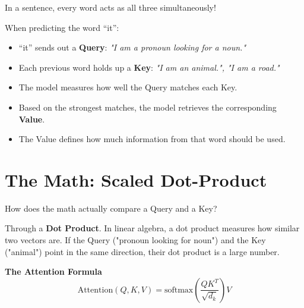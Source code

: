 \documentclass[11pt]{article}
\begin{document}
\vspace{0.15in}

In a sentence, every word acts as all three simultaneously!

When predicting the word ``it'':
\begin{itemize}[leftmargin=*, itemsep=0.1in]
    \item ``it'' sends out a \textbf{Query}: \textit{"I am a pronoun looking for a noun."}
    \item Each previous word holds up a \textbf{Key}: \textit{"I am an animal.", "I am a road."}
    \item The model measures how well the Query matches each Key.
    \item Based on the strongest matches, the model retrieves the corresponding \textbf{Value}.
    \item The Value defines how much information from that word should be used.
\end{itemize}

\newpage

\section*{The Math: Scaled Dot-Product}

\vspace{0.15in}

How does the math actually compare a Query and a Key? 

Through a \textbf{Dot Product}. In linear algebra, a dot product measures how similar two vectors are. If the Query ("pronoun looking for noun") and the Key ("animal") point in the same direction, their dot product is a large number.

\vspace{0.15in}

\begin{infobox}
{\large\color{brandblue}\textbf{The Attention Formula}}
\[
\text{Attention}(Q, K, V) = \text{softmax}\left(\frac{QK^T}{\sqrt{d_k}}\right)V
\]
\end{infobox}

\vspace{0.15in}
\end{document}
